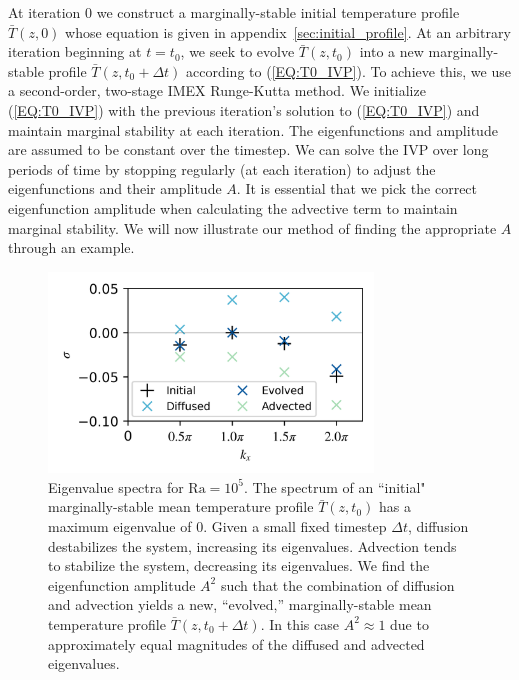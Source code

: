 \documentclass[reprint,amsmath,amssymb,aps]{revtex4-1}
\newcommand\Ra{\mathrm{Ra}}
\newcommand{\eq}[1]{(\ref{#1})}
\begin{document}
At iteration 0 we construct a marginally-stable initial temperature profile $\bar{T}(z, 0)$ whose equation is given in appendix~\ref{sec:initial_profile}. 
At an arbitrary iteration beginning at $t = t_0$, we seek to evolve $\bar{T}(z, t_0)$ into a new marginally-stable profile $\bar{T}(z, t_0 + \Delta t)$ according to \eq{EQ:T0_IVP}. 
To achieve this, we use a second-order, two-stage IMEX Runge-Kutta method.
We initialize \eq{EQ:T0_IVP} with the previous iteration's solution to \eq{EQ:T0_IVP} and maintain marginal stability at each iteration.
The eigenfunctions and amplitude are assumed to be constant over the timestep.
We can solve the IVP over long periods of time by stopping regularly (at each iteration) to adjust the eigenfunctions and their amplitude $A$.
It is essential that we pick the correct eigenfunction amplitude when calculating the advective term to maintain marginal stability.
We will now illustrate our method of finding the appropriate $A$ through an example.

\begin{figure}
    \includegraphics[width=3.4in]{EV_spectrum_ol.png}
    \caption{Eigenvalue spectra for $\Ra = 10^5$. The spectrum of an ``initial" marginally-stable mean temperature profile $\bar{T}(z, t_0)$ has a maximum eigenvalue of 0. 
    Given a small fixed timestep $\Delta t$, diffusion destabilizes the system, increasing its eigenvalues. 
    Advection tends to stabilize the system, decreasing its eigenvalues. 
    We find the eigenfunction amplitude $A^2$ such that the combination of diffusion and advection yields a new, ``evolved,'' marginally-stable mean temperature profile $\bar{T}(z, t_0 + \Delta t)$. In this case $A^2 \approx 1$ due to approximately equal magnitudes of the diffused and advected eigenvalues.}
    \label{fig:iteration_spectra} 
\end{figure}
\end{document}
